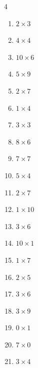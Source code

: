 \begin{multicols}{4}
\begin{enumerate}
  \item $2\times 3$
        \phantom{$=6$}

  \item $4\times 4$
        \phantom{$=16$}

  \item $10\times 6$
        \phantom{$=60$}

  \item $5\times 9$
        \phantom{$=45$}

  \item $2\times 7$
        \phantom{$=14$}

  \item $1\times 4$
        \phantom{$=4$}

  \item $3\times 3$
        \phantom{$=9$}

  \item $8\times 6$
        \phantom{$=48$}

  \item $7\times 7$
        \phantom{$=49$}

  \item $5\times 4$
        \phantom{$=20$}

  \item $2\times 7$
        \phantom{$=14$}

  \item $1\times 10$
        \phantom{$=10$}

  \item $3\times 6$
        \phantom{$=18$}

  \item $10\times 1$
        \phantom{$=10$}

  \item $1\times 7$
        \phantom{$=7$}

  \item $2\times 5$
        \phantom{$=10$}

  \item $3\times 6$
        \phantom{$=18$}

  \item $3\times 9$
        \phantom{$=27$}

  \item $0\times 1$
        \phantom{$=0$}

\columnbreak %

  \item $7\times 0$
        \phantom{$=0$}

  \item $3\times 4$
        \phantom{$=12$}


\end{enumerate}
\end{multicols}

